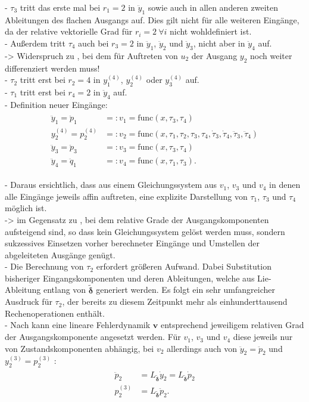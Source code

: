 - $\tau_3$ tritt das erste mal bei $r_1 = 2$ in $\ddot{y}_1$ sowie auch in allen anderen zweiten Ableitungen des flachen Ausgangs auf. Dies gilt nicht für alle weiteren Eingänge, da der relative vektorielle Grad für $r_i = 2 \ \forall i$ nicht wohldefiniert ist. \\
- Außerdem tritt $\tau_4$ auch bei $r_3 = 2$ in $\ddot{y}_1$, $\ddot{y}_2$ und $\ddot{y}_3$, nicht aber in $\ddot{y}_4$ auf. \\
-> Widerspruch zu \cite[S. 206]{NLRT_Roebenack}, bei dem für Auftreten von  $u_2$ der Ausgang $y_2$ noch weiter differenziert werden muss! \\ 
- $\tau_2$ tritt erst bei $r_2 = 4$ in $y_1^{(4)}$, $y_2^{(4)}$ oder $y_3^{(4)}$ auf. \\
- $\tau_1$ tritt erst bei $r_4 = 2$ in $\ddot{y}_4$ auf. \\
- Definition neuer Eingänge:
\begin{align}
\begin{split}
	\ddot{y}_1 = \ddot{p}_1 &=: v_1 = \mathrm{func}(x, \tau_3, \tau_4) \\
	y_2^{(4)} = p_2^{(4)} &=: v_2 = \mathrm{func}(x, \tau_1, \tau_2, \tau_3, \tau_4, \dot{\tau}_3, \dot{\tau}_4, \ddot{\tau}_3, \ddot{\tau}_4) \\
	\ddot{y}_3 = \ddot{p}_3 &=: v_3 = \mathrm{func}(x, \tau_3, \tau_4) \\
	\ddot{y}_4 = \ddot{q}_1 &=: v_4 = \mathrm{func}(x, \tau_1, \tau_3) .
\end{split}
\end{align}

- Daraus ersichtlich, dass aus einem Gleichungssystem aus $v_1$, $v_3$ und $v_4$ in denen alle Eingänge jeweils affin auftreten, eine explizite Darstellung von $\tau_1$, $\tau_3$ und $\tau_4$ möglich ist. \\
-> im Gegensatz zu \cite[S. 207]{NLRT_Roebenack}, bei dem relative Grade der Ausgangskomponenten aufsteigend sind, so dass kein Gleichungssystem gelöst werden muss, sondern sukzessives Einsetzen vorher berechneter Eingänge und Umstellen der abgeleiteten Ausgänge genügt.\\
- Die Berechnung von $\tau_2$ erfordert größeren Aufwand. Dabei Substitution bisheriger Eingangskomponenten und deren Ableitungen, welche aus Lie-Ableitung entlang von $\mathbf{\tilde{\delta}}$ generiert werden. Es folgt ein sehr umfangreicher Ausdruck für $\tau_2$, der bereits zu diesem Zeitpunkt mehr als einhunderttausend Rechenoperationen enthält. \\
- Nach \cite[S. 208]{NLRT_Roebenack} kann eine lineare Fehlerdynamik $\mathbf{v}$ entsprechend jeweiligem relativen Grad der Ausgangskomponente angesetzt werden. Für $v_1$, $v_3$ und $v_4$ diese jeweils nur von Zustandskomponenten abhängig, bei $v_2$ allerdings auch von $\ddot{y}_2 = \ddot{p}_2$ und $y_2^{(3)} = p_2^{(3)}$ :
\begin{align}
	\begin{split}
		\ddot{p}_2 &= L_{\tilde{\boldsymbol{\delta}}} \dot{y}_2 = L_{\tilde{\boldsymbol{\delta}}} \dot{p}_2 \\
		p_2^{(3)} &= L_{\tilde{\boldsymbol{\delta}}} \ddot{p}_2.
	\end{split}
\end{align}

